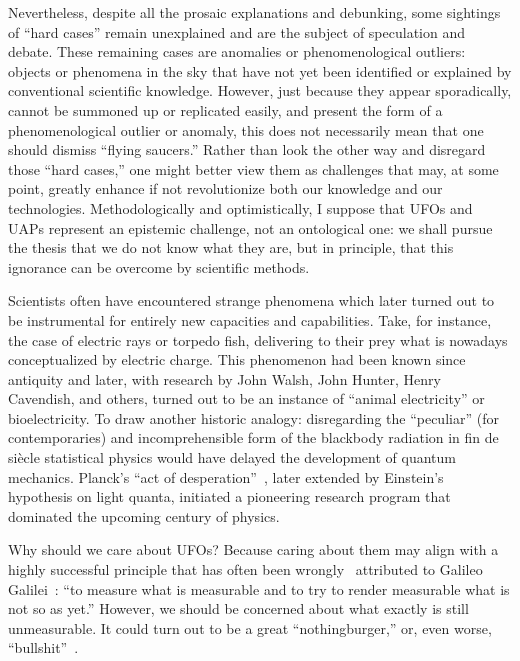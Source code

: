 Nevertheless, despite all the prosaic explanations and debunking, some sightings of ``hard cases''
remain unexplained and are the subject of speculation and debate.
These remaining cases are anomalies or phenomenological outliers:
objects or phenomena in the sky that have not yet been identified or explained by conventional scientific knowledge.
However,
just because they appear sporadically,
cannot be summoned up or replicated easily, and present the form of a phenomenological outlier or anomaly,
this does not necessarily mean that one should dismiss ``flying saucers.''
Rather than look the other way and disregard those ``hard cases,'' one might better view them as challenges that may,
at some point, greatly enhance if not revolutionize both our knowledge and our technologies.
Methodologically and optimistically, I suppose that UFOs and UAPs represent an epistemic challenge,
not an ontological one: we shall pursue the thesis that we do not know what they are,
but in principle, that this ignorance can be overcome by scientific methods.


Scientists often have encountered strange phenomena which later turned out to be instrumental
for entirely new capacities and capabilities.
Take, for instance, the case of electric rays or torpedo fish,
delivering to their prey what is nowadays conceptualized by electric charge.
This phenomenon had been known since antiquity and later, with research by John Walsh, John Hunter, Henry Cavendish, and others,
turned out to be an instance of ``animal electricity'' or bioelectricity.
To draw another historic analogy: disregarding the ``peculiar'' (for contemporaries) and incomprehensible form of the blackbody
radiation in fin de si\`ecle statistical physics would have delayed the development of quantum mechanics.
Planck's ``act of desperation''~\cite[p.~23]{Hermann1974Nov}, later extended by Einstein's hypothesis on light quanta,
initiated a pioneering research program that dominated the upcoming century of physics.


Why should we care about UFOs?
Because caring about them may align
with a highly successful principle that has often been wrongly~\cite{Kleinert_2009} attributed to Galileo Galilei~\cite[p.~139]{weyl:49}:
``to measure what is measurable and to try to render  measurable what is not so as yet.''
However, we should be concerned about what  exactly  is still unmeasurable.
It could turn out to be a great ``nothingburger,'' or, even worse,  ``bullshit''~\cite{Frankfurt-OnBullshit}.

